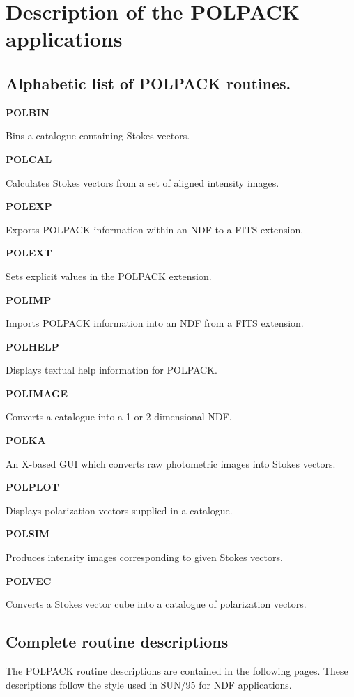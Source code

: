 \documentclass[twoside,11pt]{article}
\newenvironment{latexonly}{}{}
\newcommand{\xref}[3]{#1}
\renewcommand{\_}{\texttt{\symbol{95}}}
\newcommand{\quickdes}[3]{
                         \parbox{1.1in}{\bf #1}
                         \parbox{4.4in}{\raggedright #2 \dotfill}
                         \parbox{0.6in}{\pageref{#3}}
                         \vspace*{0.2in}}
\newcommand{\latexonlysubsection}[1]{\subsection{#1}}
\newcommand{\latexonlysubsection}[1]{#1}
\begin{document}
\section{ \label{APP:DESCRIPTION}Description of the POLPACK applications}
\begin{latexonly}
\latexonlysubsection{Alphabetic list of POLPACK routines.}
%
%
\quickdes{POLBIN}{Bins a catalogue containing Stokes vectors.}{ POLBIN }

\quickdes{POLCAL}{Calculates Stokes vectors from a set of aligned intensity images.}{ POLCAL }

\quickdes{POLEXP}{Exports POLPACK information within an NDF to a FITS extension.}{ POLEXP }

\quickdes{POLEXT}{Sets explicit values in the POLPACK extension.}{ POLEXT }

\quickdes{POLIMP}{Imports POLPACK information into an NDF from a FITS
extension.}{ POLEXP }

\quickdes{POLHELP}{Displays textual help information for POLPACK.}{
POLHELP }

\quickdes{POLIMAGE}{Converts a catalogue into a 1 or 2-dimensional NDF.}
{ POLIMAGE }

\quickdes{POLKA}{An X-based GUI which converts raw photometric images
into Stokes vectors.}{ POLKA }

\quickdes{POLPLOT}{Displays polarization vectors supplied in a
catalogue.}{ POLPLOT }

\quickdes{POLSIM}{Produces intensity images corresponding to given Stokes
vectors.}{ POLSIM }

\quickdes{POLVEC}{Converts a Stokes vector cube into a catalogue of
polarization vectors.}{ POLVEC }

\end{latexonly}

\subsection{Complete routine descriptions \label{descriptions}}

The POLPACK routine descriptions are contained in the following pages.
These descriptions follow the style used in \xref{SUN/95}{sun95}{ap_full}
for NDF applications.
\end{document}
